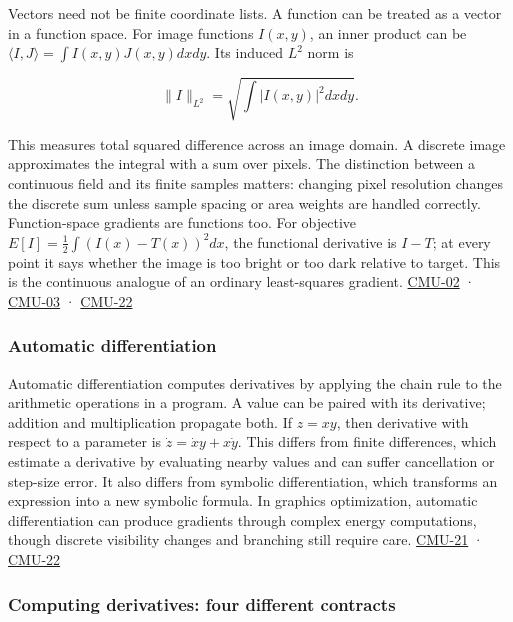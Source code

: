 Vectors need not be finite coordinate lists. A function can be treated as a vector in a function space. For image functions \(I(x,y)\), an inner product can be \(\langle I,J\rangle=\int I(x,y)J(x,y)dxdy\). Its induced \(L^2\) norm is

\[
\|I\|_{L^2}=\sqrt{\int |I(x,y)|^2dxdy}.
\]

This measures total squared difference across an image domain. A discrete image approximates the integral with a sum over pixels. The distinction between a continuous field and its finite samples matters: changing pixel resolution changes the discrete sum unless sample spacing or area weights are handled correctly. Function-space gradients are functions too. For objective \(E[I]=\tfrac12\int (I(x)-T(x))^2dx\), the functional derivative is \(I-T\); at every point it says whether the image is too bright or too dark relative to target. This is the continuous analogue of an ordinary least-squares gradient. \hyperref[04-visual-computing-ii-ch036]{CMU-02} · \hyperref[04-visual-computing-ii-ch036]{CMU-03} · \hyperref[04-visual-computing-ii-ch036]{CMU-22}

\subsubsection{Automatic differentiation}\label{automatic-differentiation}

Automatic differentiation computes derivatives by applying the chain rule to the arithmetic operations in a program. A value can be paired with its derivative; addition and multiplication propagate both. If \(z=xy\), then derivative with respect to a parameter is \(\dot z=\dot x y+x\dot y\). This differs from finite differences, which estimate a derivative by evaluating nearby values and can suffer cancellation or step-size error. It also differs from symbolic differentiation, which transforms an expression into a new symbolic formula. In graphics optimization, automatic differentiation can produce gradients through complex energy computations, though discrete visibility changes and branching still require care. \hyperref[04-visual-computing-ii-ch036]{CMU-21} · \hyperref[04-visual-computing-ii-ch036]{CMU-22}

\subsubsection{Computing derivatives: four different contracts}\label{computing-derivatives-four-different-contracts}

